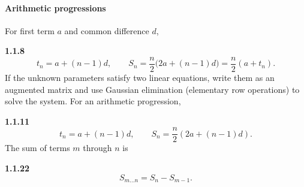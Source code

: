 \paragraph*{Arithmetic progressions}
For first term $a$ and common difference $d$,
\setcounter{qcurrent}{8}\setcounter{equation}{0}
\par\noindent\textbf{1.1.8}\quad
\begin{equation}
t_n=a+(n-1)d,\qquad
S_n=\frac n2\bigl(2a+(n-1)d\bigr)=\frac n2(a+t_n).
\label{eq:ap}
\end{equation}
If the unknown parameters satisfy two linear equations, write them as an augmented matrix and use Gaussian elimination (elementary row operations) to solve the system.
For an arithmetic progression,
\par\noindent\textbf{1.1.11}\quad
\begin{equation}
 t_n=a+(n-1)d,\qquad S_n=\frac n2\left(2a+(n-1)d\right).\tag{1.1.11.1}\label{eq:ap-question-11}
\end{equation}
The sum of terms $m$ through $n$ is
\par\noindent\textbf{1.1.22}\quad
\begin{equation}
S_{m\ldots n}=S_n-S_{m-1}.\tag{1.1.22.1}\label{eq:ap-subsum}
\end{equation}

